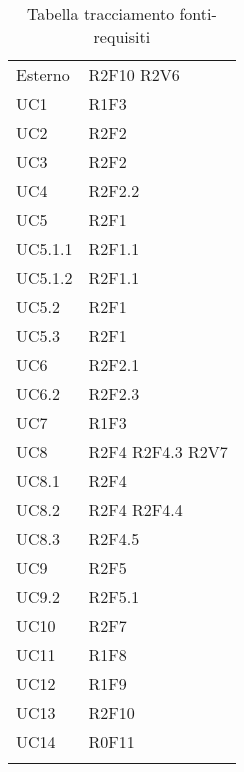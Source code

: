 \begin{center}
\begin{longtable}{  p{5cm} p{5cm} }
		Esterno	& R2F10 \newline R2V6 \\
		UC1 & R1F3 \\
		UC2 & R2F2 \\
		UC3 & R2F2 \\
		UC4 & R2F2.2 \\
		UC5 & R2F1 \\
		UC5.1.1 & R2F1.1 \\
		UC5.1.2 & R2F1.1 \\
		UC5.2 & R2F1 \\
		UC5.3 & R2F1 \\
		UC6 & R2F2.1 \\
		UC6.2 & R2F2.3 \\
		UC7 & R1F3 \\
		UC8 & R2F4 \newline R2F4.3 \newline R2V7 \\
		UC8.1 & R2F4 \\
		UC8.2 & R2F4 \newline R2F4.4 \\
		UC8.3 & R2F4.5 \\
		UC9 & R2F5 \\
		UC9.2 & R2F5.1 \\
		UC10 & R2F7 \\
		UC11 & R1F8 \\
		UC12 & R1F9 \\
		UC13 & R2F10 \\
		UC14 & R0F11 \\
		\rowcolor{white}
		\caption{Tabella tracciamento fonti-requisiti}
	\end{longtable}
\end{center}
